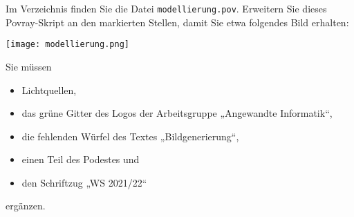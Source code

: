 %
Im Verzeichnis  finden Sie die 
Datei \texttt{modellierung.pov}. Erweitern 
Sie dieses Povray-Skript an den markierten Stellen, damit Sie etwa 
folgendes Bild erhalten:
\begin{center}
  \texttt{[image: modellierung.png]}
\end{center}
Sie müssen
\begin{itemize}
  \item Lichtquellen,
  \item das grüne Gitter des Logos der Arbeitsgruppe „Angewandte Informatik“,
  \item die fehlenden Würfel des Textes „Bildgenerierung“,
  \item einen Teil des Podestes und
  \item den Schriftzug „WS 2021/22“
\end{itemize}
ergänzen. 
